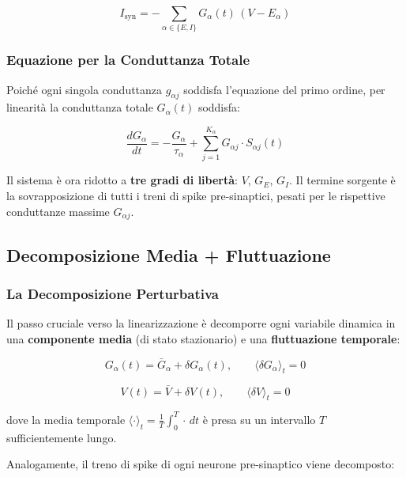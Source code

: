 \begin{equation}
I_{\text{syn}} = -\sum_{\alpha \in \{E,I\}} G_\alpha(t)\,(V - E_\alpha)
\end{equation}

\subsubsection{Equazione per la Conduttanza Totale}

Poiché ogni singola conduttanza $g_{\alpha j}$ soddisfa l'equazione del primo ordine, per linearità la conduttanza totale $G_\alpha(t)$ soddisfa:

\begin{equation}
\frac{d G_\alpha}{dt} = -\frac{G_\alpha}{\tau_\alpha} + \sum_{j=1}^{K_\alpha} G_{\alpha j} \cdot S_{\alpha j}(t)
\end{equation}

Il sistema è ora ridotto a \textbf{tre gradi di libertà}: $V$, $G_E$, $G_I$. Il termine sorgente è la sovrapposizione di tutti i treni di spike pre-sinaptici, pesati per le rispettive conduttanze massime $G_{\alpha j}$.


\subsection{Decomposizione Media + Fluttuazione}

\subsubsection{La Decomposizione Perturbativa}

Il passo cruciale verso la linearizzazione è decomporre ogni variabile dinamica in una \textbf{componente media} (di stato stazionario) e una \textbf{fluttuazione temporale}:

\begin{equation}
G_\alpha(t) = \bar{G}_\alpha + \delta G_\alpha(t), \qquad \langle \delta G_\alpha \rangle_t = 0
\end{equation}

\begin{equation}
V(t) = \bar{V} + \delta V(t), \qquad \langle \delta V \rangle_t = 0
\end{equation}

dove la media temporale $\langle \cdot \rangle_t = \frac{1}{T}\int_0^T \cdot\, dt$ è presa su un intervallo $T$ sufficientemente lungo.

Analogamente, il treno di spike di ogni neurone pre-sinaptico viene decomposto:

